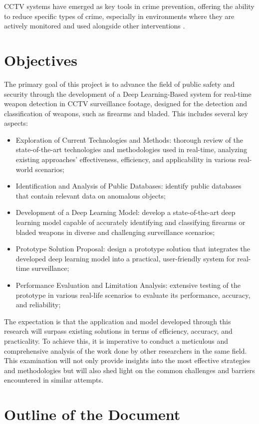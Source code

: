 CCTV systems have emerged as key tools in crime prevention, offering the ability to reduce specific types of crime, especially in environments where they are actively monitored and used alongside other interventions \cite{rfc35}. 
\section{Objectives}
The primary goal of this project is to advance the field of public safety and security through the development of a Deep Learning-Based system for real-time weapon detection in CCTV surveillance footage, designed for the detection and classification of weapons, such as firearms and bladed. This includes several key aspects:
\begin{itemize}
    \item Exploration of Current Technologies and Methods: thorough review of the state-of-the-art technologies and methodologies used in real-time, analyzing existing approaches' effectiveness, efficiency, and applicability in various real-world scenarios;
    \item Identification and Analysis of Public Databases: identify public databases that contain relevant data on anomalous objects;
    \item Development of a Deep Learning Model: develop a state-of-the-art deep learning model capable of accurately identifying and classifying firearms or bladed weapons in diverse and challenging surveillance scenarios;
    \item Prototype Solution Proposal: design a prototype solution that integrates the developed deep learning model into a practical, user-friendly system for real-time surveillance;
    \item Performance Evaluation and Limitation Analysis: extensive testing of the prototype in various real-life scenarios to evaluate its performance, accuracy, and reliability;
\end{itemize}

The expectation is that the application and model developed through this research will surpass existing solutions in terms of efficiency, accuracy, and practicality. To achieve this, it is imperative to conduct a meticulous and comprehensive analysis of the work done by other researchers in the same field. This examination will not only provide insights into the most effective strategies and methodologies but will also shed light on the common challenges and barriers encountered in similar attempts.  
\section{Outline of the Document}
